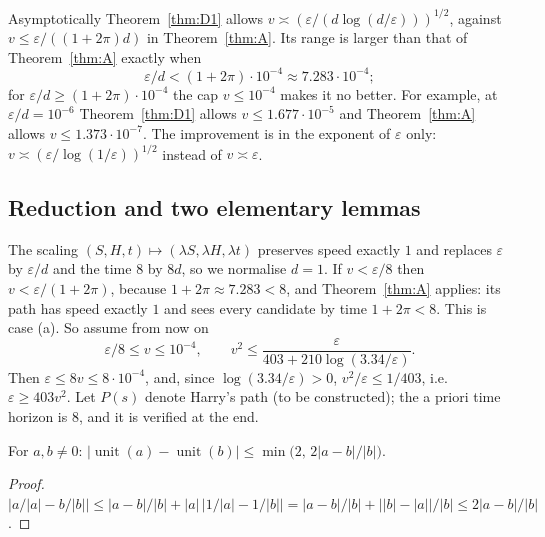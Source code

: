 \begin{remark}[Range]\label{rem:D1-range}
Asymptotically Theorem~\ref{thm:D1} allows $v\asymp(\varepsilon/(d\log(d/\varepsilon)))^{1/2}$, against
$v\le\varepsilon/((1+2\pi)d)$ in Theorem~\ref{thm:A}. Its range is larger than that of Theorem~\ref{thm:A} exactly when
\[
\varepsilon/d<(1+2\pi)\cdot10^{-4}\approx7.283\cdot10^{-4};
\]
for $\varepsilon/d\ge(1+2\pi)\cdot10^{-4}$ the cap $v\le10^{-4}$ makes it no better. For example, at $\varepsilon/d=10^{-6}$
Theorem~\ref{thm:D1} allows $v\le1.677\cdot10^{-5}$ and Theorem~\ref{thm:A} allows $v\le1.373\cdot10^{-7}$. The improvement is
in the exponent of $\varepsilon$ only: $v\asymp(\varepsilon/\log(1/\varepsilon))^{1/2}$ instead of $v\asymp\varepsilon$.
\end{remark}

\subsection{Reduction and two elementary lemmas}
The scaling $(S,H,t)\mapsto(\lambda S,\lambda H,\lambda t)$ preserves speed exactly $1$ and replaces $\varepsilon$ by
$\varepsilon/d$ and the time $8$ by $8d$, so we normalise $d=1$. If $v<\varepsilon/8$ then $v<\varepsilon/(1+2\pi)$, because
$1+2\pi\approx7.283<8$, and Theorem~\ref{thm:A} applies: its path has speed exactly $1$ and sees every candidate by time
$1+2\pi<8$. This is case (a). So assume from now on
\begin{equation}\label{eq:D-A0}
\tag{A0}
\varepsilon/8\le v\le10^{-4},\qquad v^2\le\frac{\varepsilon}{403+210\log(3.34/\varepsilon)}.
\end{equation}
Then $\varepsilon\le8v\le8\cdot10^{-4}$, and, since $\log(3.34/\varepsilon)>0$, $v^2/\varepsilon\le1/403$, i.e.\
$\varepsilon\ge403v^2$. Let $P(s)$ denote Harry's path (to be constructed); the a priori time horizon is $8$, and it is
verified at the end.

\begin{lemma}\label{lem:D-unit}
For $a,b\neq0$: $|\operatorname{unit}(a)-\operatorname{unit}(b)|\le\min\bigl(2,\,2|a-b|/|b|\bigr)$.
\end{lemma}
\begin{proof}
$\bigl|a/|a|-b/|b|\bigr|\le|a-b|/|b|+|a|\,\bigl|1/|a|-1/|b|\bigr|=|a-b|/|b|+\bigl||b|-|a|\bigr|/|b|\le2|a-b|/|b|$.
\end{proof}

